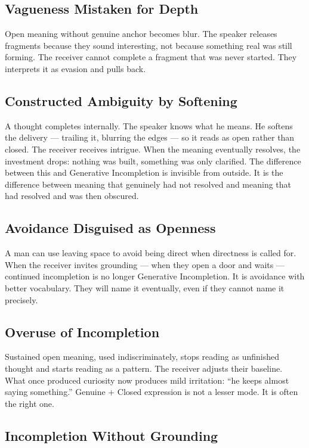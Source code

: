 \subsection{Vagueness Mistaken for Depth}

Open meaning without genuine anchor becomes blur. The speaker releases fragments 
because they sound interesting, not because something real was still forming. 
The receiver cannot complete a fragment that was never started. They interprets 
it as evasion and pulls back.

\subsection{Constructed Ambiguity by Softening}

A thought completes internally. The speaker knows what he means. He softens the 
delivery --- trailing it, blurring the edges --- so it reads as open rather than closed. 
The receiver receives intrigue. When the meaning eventually resolves, 
the investment drops: nothing was built, something was only clarified. The difference between 
this and Generative Incompletion is invisible from outside. It is the difference between 
meaning that genuinely had not resolved and meaning that had resolved and was then obscured.

\subsection{Avoidance Disguised as Openness}

A man can use leaving space to avoid being direct when directness is called for. 
When the receiver invites grounding --- when they open a door and waits --- continued 
incompletion is no longer Generative Incompletion. It is avoidance with better vocabulary. 
They will name it eventually, even if they cannot name it precisely.

\subsection{Overuse of Incompletion}

Sustained open meaning, used indiscriminately, stops reading as unfinished thought and 
starts reading as a pattern. The receiver adjusts their baseline. What once produced curiosity 
now produces mild irritation: ``he keeps almost saying something.'' Genuine + Closed expression 
is not a lesser mode. It is often the right one.

\subsection{Incompletion Without Grounding}

